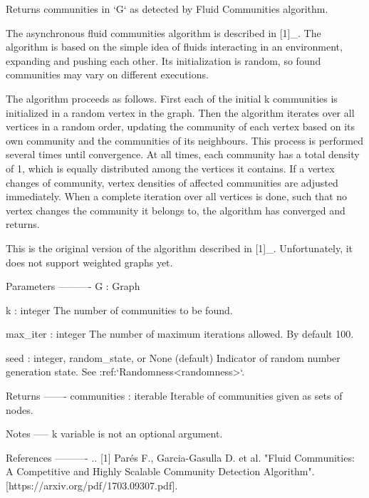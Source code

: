 \begin{DoxyVerb}Returns communities in `G` as detected by Fluid Communities algorithm.

The asynchronous fluid communities algorithm is described in
[1]_. The algorithm is based on the simple idea of fluids interacting
in an environment, expanding and pushing each other. Its initialization is
random, so found communities may vary on different executions.

The algorithm proceeds as follows. First each of the initial k communities
is initialized in a random vertex in the graph. Then the algorithm iterates
over all vertices in a random order, updating the community of each vertex
based on its own community and the communities of its neighbours. This
process is performed several times until convergence.
At all times, each community has a total density of 1, which is equally
distributed among the vertices it contains. If a vertex changes of
community, vertex densities of affected communities are adjusted
immediately. When a complete iteration over all vertices is done, such that
no vertex changes the community it belongs to, the algorithm has converged
and returns.

This is the original version of the algorithm described in [1]_.
Unfortunately, it does not support weighted graphs yet.

Parameters
----------
G : Graph

k : integer
    The number of communities to be found.

max_iter : integer
    The number of maximum iterations allowed. By default 100.

seed : integer, random_state, or None (default)
    Indicator of random number generation state.
    See :ref:`Randomness<randomness>`.

Returns
-------
communities : iterable
    Iterable of communities given as sets of nodes.

Notes
-----
k variable is not an optional argument.

References
----------
.. [1] Parés F., Garcia-Gasulla D. et al. "Fluid Communities: A
   Competitive and Highly Scalable Community Detection Algorithm".
   [https://arxiv.org/pdf/1703.09307.pdf].
\end{DoxyVerb}
 
